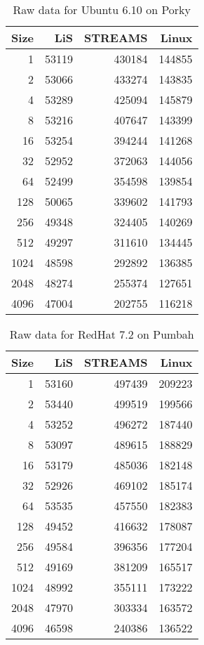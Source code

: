 \documentclass[letterpaper,final,notitlepage,twocolumn,10pt,twoside]{article}
\begin{document}
\begin{appendix}
\begin{table}[hp]
\footnotesize
\center\begin{tabular}{rrrr}\\
\hline
Size & LiS & STREAMS & Linux\\
\hline
\hline
1 & 53119 & 430184 & 144855\\
2 & 53066 & 433274 & 143835\\
4 & 53289 & 425094 & 145879\\
8 & 53216 & 407647 & 143399\\
16 & 53254 & 394244 & 141268\\
32 & 52952 & 372063 & 144056\\
64 & 52499 & 354598 & 139854\\
128 & 50065 & 339602 & 141793\\
256 & 49348 & 324405 & 140269\\
512 & 49297 & 311610 & 134445\\
1024 & 48598 & 292892 & 136385\\
2048 & 48274 & 255374 & 127651\\
4096 & 47004 & 202755 & 116218\\
\hline
\end{tabular}
\caption{Raw data for Ubuntu 6.10 on Porky}
\label{table:ubuntudata}
\normalsize
\end{table}

\begin{table}[hp]
\footnotesize
\center\begin{tabular}{rrrr}\\
\hline
Size & LiS & STREAMS & Linux\\
\hline
\hline
1 & 53160 & 497439 & 209223\\
2 & 53440 & 499519 & 199566\\
4 & 53252 & 496272 & 187440\\
8 & 53097 & 489615 & 188829\\
16 & 53179 & 485036 & 182148\\
32 & 52926 & 469102 & 185174\\
64 & 53535 & 457550 & 182383\\
128 & 49452 & 416632 & 178087\\
256 & 49584 & 396356 & 177204\\
512 & 49169 & 381209 & 165517\\
1024 & 48992 & 355111 & 173222\\
2048 & 47970 & 303334 & 163572\\
4096 & 46598 & 240386 & 136522\\
\hline
\end{tabular}
\caption{Raw data for RedHat 7.2 on Pumbah}
\label{table:rh7data}
\normalsize
\end{table}


\end{appendix}
\end{document}
